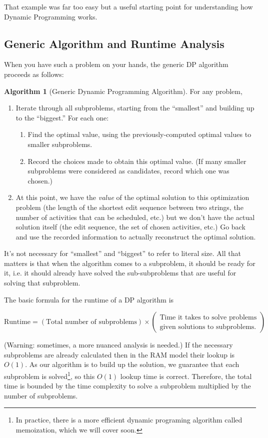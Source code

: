 \documentclass[10pt]{article}
\theoremstyle{plain}
\theoremstyle{definition}
\newtheorem{alg}[thm]{Algorithm}
\numberwithin{equation}{section}
\numberwithin{figure}{section}
\begin{document}
\noindent That example was far too easy but a useful starting point for understanding how Dynamic Programming works. 

\subsection{Generic Algorithm and Runtime Analysis}
When you have such a problem on your hands, the generic DP algorithm proceeds as follows:
\begin{framed}
\begin{alg}[Generic Dynamic Programming Algorithm]
For any problem,
\begin{enumerate}
\item Iterate through all subproblems, starting from the ``smallest'' and building up to the ``biggest.'' For each one:
\begin{enumerate}
\item Find the optimal value, using the previously-computed optimal values to smaller subproblems.
\item Record the choices made to obtain this optimal value. (If many smaller subproblems were considered as candidates, record which one was chosen.)
\end{enumerate}
\item At this point, we have the \emph{value} of the optimal solution to this optimization problem (the length of the shortest edit sequence between two strings, the number of activities that can be scheduled, etc.) but we don't have the actual solution itself (the edit sequence, the set of chosen activities, etc.) Go back and use the recorded information to actually reconstruct the optimal solution.
\end{enumerate}
\end{alg}
\end{framed}
\noindent It's not necessary for ``smallest'' and ``biggest'' to refer to literal size. All that matters is that when the algorithm comes to a subproblem, it should be ready for it, i.e. it should already have solved the sub-subproblems that are useful for solving that subproblem.

\noindent The basic formula for the runtime of a DP algorithm is
\begin{framed}
\[
\text{Runtime} = (\text{Total number of subproblems}) \times \left(\begin{array}{c}\text{Time it takes to solve problems} \\ \text{given solutions to subproblems.}\end{array}\right)
\]
\end{framed}
\noindent (Warning: sometimes, a more nuanced analysis is needed.) If the necessary subproblems are already calculated then in the RAM model their lookup is $O(1)$. As our algorithm is to build up the solution, we guarantee that each subproblem is solved\footnote{In practice, there is a more efficient dynamic programing algorithm called memoization, which we will cover soon.}, so this $O(1)$ lookup time is correct. Therefore, the total time is bounded by the time complexity to solve a subproblem multiplied by the number of subproblems. \\
\end{document}
